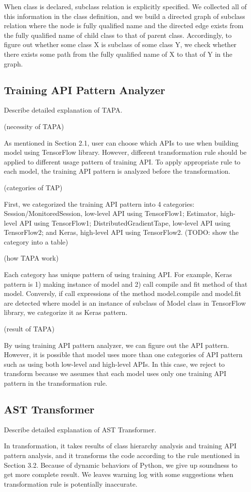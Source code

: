When class is declared, subclass relation is explicitly specified.
We collected all of this information in the class definition,
and we build a directed graph of subclass relation
where the node is fully qualified name and the directed edge exists
from the fully qualified name of child class to that of parent class.
Accordingly, to figure out whether some class X is subclass of some class Y,
we check whether there exists some path from the fully qualified name of X
to that of Y in the graph.

\subsection{Training API Pattern Analyzer}
Describe detailed explanation of TAPA.

(necessity of TAPA)

As mentioned in Section 2.1, user can choose which APIs to use
when building model using TensorFlow library.
However, different transformation rule should be applied
to different usage pattern of training API.
To apply appropriate rule to each model,
the training API pattern is analyzed before the transformation.

(categories of TAP)

First, we categorized the training API pattern into 4 categories:
Session/MonitoredSession, low-level API using TensorFlow1;
Estimator, high-level API using TensorFlow1;
DistributedGradientTape, low-level API using TensorFlow2;
and Keras, high-level API using TensorFlow2.
(TODO: show the category into a table)

(how TAPA work)

Each category has unique pattern of using training API.
For example, Keras pattern is 1) making instance of model and
2) call compile and fit method of that model.
Conversly, if call expressions of the method model.compile and model.fit are detected
where model is an instance of subclass of Model class in TensorFlow library,
we categorize it as Keras pattern.

(result of TAPA)

By using training API pattern analyzer, we can figure out the API pattern.
However, it is possible that model uses more than one categories of API pattern
such as using both low-level and high-level APIs.
In this case, we reject to transform because we assumes
that each model uses only one training API pattern in the transformation rule.

\subsection{AST Transformer}
Describe detailed explanation of AST Transformer.

In transformation, it takes results of class hierarchy analysis
and training API pattern analysis, and it transforms the code
according to the rule mentioned in Section 3.2.
Because of dynamic behaviors of Python, we give up soundness
to get more complete result.
We leaves warning log with some suggestions
when transformation rule is potentially inaccurate.

